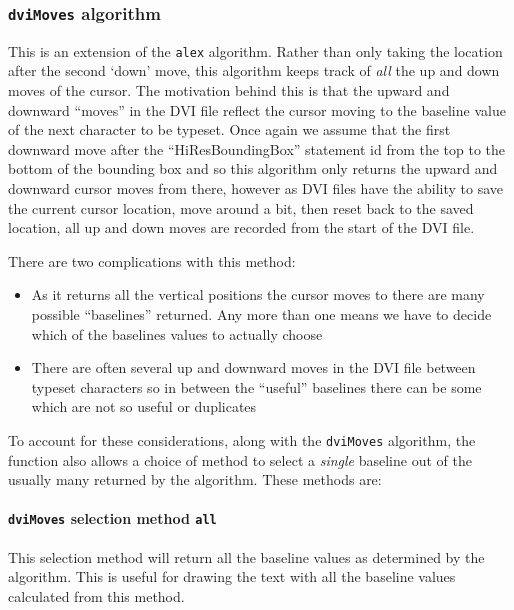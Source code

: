 \documentclass[]{article}
\let\oldparagraph\paragraph
\renewcommand{\paragraph}[1]{\oldparagraph{#1}\mbox{}}
\begin{document}
\subsubsection{\texorpdfstring{\texttt{dviMoves}
algorithm}{dviMoves algorithm}}\label{dvimoves-algorithm}

This is an extension of the \texttt{alex} algorithm. Rather than only
taking the location after the second `down' move, this algorithm keeps
track of \emph{all} the up and down moves of the cursor. The motivation
behind this is that the upward and downward ``moves'' in the DVI file
reflect the cursor moving to the baseline value of the next character to
be typeset. Once again we assume that the first downward move after the
``HiResBoundingBox'' statement id from the top to the bottom of the
bounding box and so this algorithm only returns the upward and downward
cursor moves from there, however as DVI files have the ability to save
the current cursor location, move around a bit, then reset back to the
saved location, all up and down moves are recorded from the start of the
DVI file.

There are two complications with this method:

\begin{itemize}
\item
  As it returns all the vertical positions the cursor moves to there are
  many possible ``baselines'' returned. Any more than one means we have
  to decide which of the baselines values to actually choose
\item
  There are often several up and downward moves in the DVI file between
  typeset characters so in between the ``useful'' baselines there can be
  some which are not so useful or duplicates
\end{itemize}

To account for these considerations, along with the \texttt{dviMoves}
algorithm, the function also allows a choice of method to select a
\emph{single} baseline out of the usually many returned by the
algorithm. These methods are:

\paragraph{\texorpdfstring{\texttt{dviMoves} selection method
\texttt{all}}{dviMoves selection method all}}\label{dvimoves-selection-method-all}

This selection method will return all the baseline values as determined
by the algorithm. This is useful for drawing the text with all the
baseline values calculated from this method.
\end{document}
